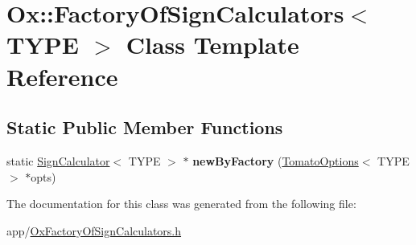 \hypertarget{class_ox_1_1_factory_of_sign_calculators}{\section{Ox\-:\-:Factory\-Of\-Sign\-Calculators$<$ T\-Y\-P\-E $>$ Class Template Reference}
\label{class_ox_1_1_factory_of_sign_calculators}
}
\subsection*{Static Public Member Functions}
\begin{DoxyCompactItemize}
\item 
\hypertarget{class_ox_1_1_factory_of_sign_calculators_ac53542904959b31382d7b895346f1e80}{static \hyperlink{class_ox_1_1_sign_calculator}{Sign\-Calculator}$<$ T\-Y\-P\-E $>$ $\ast$ {\bfseries new\-By\-Factory} (\hyperlink{struct_ox_1_1_tomato_options}{Tomato\-Options}$<$ T\-Y\-P\-E $>$ $\ast$opts)}\label{class_ox_1_1_factory_of_sign_calculators_ac53542904959b31382d7b895346f1e80}

\end{DoxyCompactItemize}


The documentation for this class was generated from the following file\-:\begin{DoxyCompactItemize}
\item 
app/\hyperlink{_ox_factory_of_sign_calculators_8h}{Ox\-Factory\-Of\-Sign\-Calculators.\-h}\end{DoxyCompactItemize}
